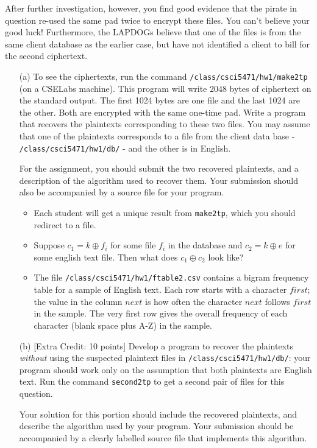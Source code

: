 \documentclass[11pt]{article}
\begin{document}
After further investigation, however, you find good evidence that the
pirate in question re-used the same pad twice to encrypt these
files. You can't believe your good luck!  Furthermore, the LAPDOGs
believe that one of the files is from the same client database as the
earlier case, but have not identified a client to bill for the second
ciphertext.

\begin{itemize}
\item[(a)] To see the ciphertexts, run the command
  \verb#/class/csci5471/hw1/make2tp# (on a CSELabs machine).  This program
  will write 2048 bytes of ciphertext on the standard output.  The
  first 1024 bytes are one file and the last 1024 are the other.  Both
  are encrypted with the same one-time pad.  Write a program that
  recovers the plaintexts corresponding to these two files.  You may
  assume that one of the plaintexts corresponds to a file from the
  client data base -  \verb#/class/csci5471/hw1/db/#  - and the other is in English.

  For the assignment, you should submit the two recovered plaintexts,
  and a description of the algorithm used to recover them.  Your
  submission should also be accompanied by a source file for your
  program.

  \begin{itemize}
  \item Each student will get a
    unique result from \verb#make2tp#, which you should
    redirect to a file.
  \item Suppose $c_1 = k \oplus f_i$ for some file $f_i$ in the
    database and $c_2 = k \oplus e$ for some english text file.
    Then what does $c_1\oplus c_2$ look like?
  \item The file \verb#/class/csci5471/hw1/ftable2.csv# contains a bigram frequency table
    for a sample of English text.  Each row starts with a character $first$;
    the value in the column $next$ is how often the character $next$
    follows $first$ in the sample.  The very first row gives the overall
    frequency of each character (blank space plus A-Z) in the sample.
  \end{itemize}
\item[(b)] [Extra Credit: 10 points] Develop a program to recover the
  plaintexts {\em without} using the suspected plaintext files in
  \verb#/class/csci5471/hw1/db/#: your program should work only on the assumption
  that both plaintexts are English text.  Run the command
  \verb#second2tp# to get a second pair of files for this question.

  Your solution for this portion should include the recovered
  plaintexts, and describe the algorithm used by your program. Your
  submission should be accompanied by a clearly labelled source file
  that implements this algorithm.
\end{itemize}
\end{document}
